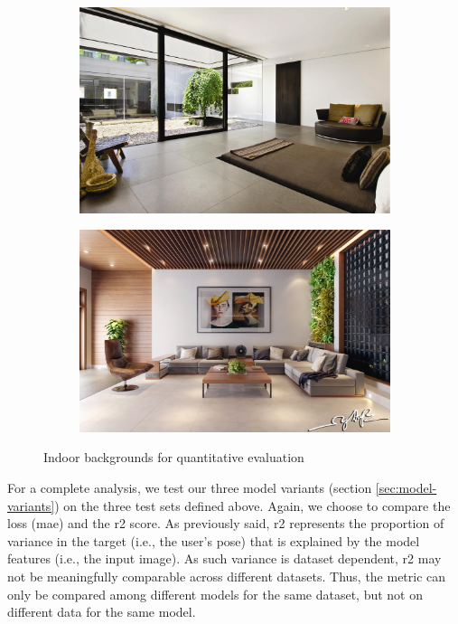 \begin{figure}[!h]
	\begin{center}
		\begin{subfigure}[h]{0.49\textwidth}
			\centering
			\includegraphics[width=1\textwidth]{"contents/images/06-indoor1"}
		\end{subfigure}
		\hfill
		\begin{subfigure}[h]{0.49\textwidth}
			\centering
			\includegraphics[width=1\textwidth]{"contents/images/06-indoor2"}
		\end{subfigure}
	\end{center}
	\vspace{-0.5cm}
	\caption[Indoor backgrounds for quantitative evaluation]{Indoor backgrounds for quantitative evaluation}
	\label{fig:test-indoor}
\end{figure}

For a complete analysis, we test our three model variants (section \ref{sec:model-variants}) on the three test sets defined above. Again, we choose to compare the loss (\gls{mae}) and the \gls{r2} score. As previously said, \gls{r2} represents the proportion of variance in the target (i.e., the user's pose) that is explained by the model features (i.e., the input image). As such variance is dataset dependent, \gls{r2} may not be meaningfully comparable across different datasets. Thus, the metric can only be compared among different models for the same dataset, but not on different data for the same model.

